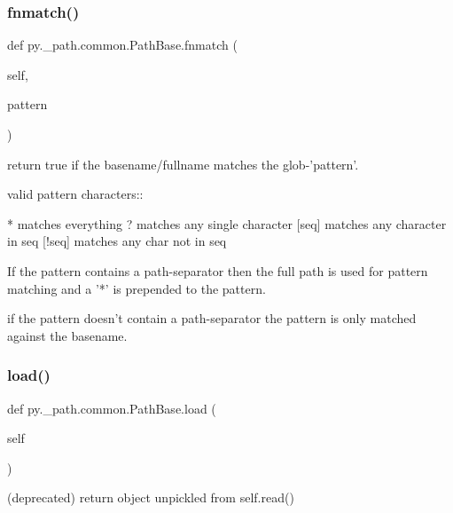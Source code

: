 \subsubsection{\texorpdfstring{fnmatch()}{fnmatch()}}
{\footnotesize\ttfamily def py.\+\_\+path.\+common.\+Path\+Base.\+fnmatch (\begin{DoxyParamCaption}\item[{}]{self,  }\item[{}]{pattern }\end{DoxyParamCaption})}

\begin{DoxyVerb}return true if the basename/fullname matches the glob-'pattern'.

valid pattern characters::

    *       matches everything
    ?       matches any single character
    [seq]   matches any character in seq
    [!seq]  matches any char not in seq

If the pattern contains a path-separator then the full path
is used for pattern matching and a '*' is prepended to the
pattern.

if the pattern doesn't contain a path-separator the pattern
is only matched against the basename.
\end{DoxyVerb}
 \mbox{\label{classpy_1_1__path_1_1common_1_1_path_base_a01b4c43a65e2187e05160485645d7c74}} 
\subsubsection{\texorpdfstring{load()}{load()}}
{\footnotesize\ttfamily def py.\+\_\+path.\+common.\+Path\+Base.\+load (\begin{DoxyParamCaption}\item[{}]{self }\end{DoxyParamCaption})}

\begin{DoxyVerb}(deprecated) return object unpickled from self.read() \end{DoxyVerb}
 \mbox{\label{classpy_1_1__path_1_1common_1_1_path_base_a27bea9b9d4031d0063294cbbf3735ef9}} 
